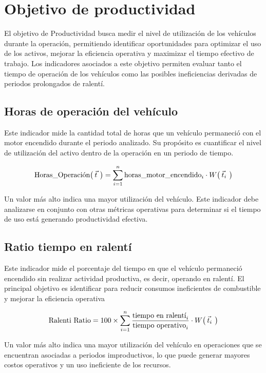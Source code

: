 \section{Objetivo de productividad}
El objetivo de Productividad busca medir el nivel de utilización de los vehículos durante la operación, permitiendo identificar oportunidades para optimizar el uso de los activos, mejorar la eficiencia operativa y maximizar el tiempo efectivo de trabajo. Los indicadores asociados a este objetivo permiten evaluar tanto el tiempo de operación de los vehículos como las posibles ineficiencias derivadas de periodos prolongados de ralentí.


\subsection{Horas de operación del vehículo}
Este indicador mide la cantidad total de horas que un vehículo permaneció con el motor encendido durante el periodo analizado. Su propósito es cuantificar el nivel de utilización del activo dentro de la operación en un periodo de tiempo.

\begin{equation*}
    \text{Horas\_Operación}\big( \hspace{0.07cm} \smash{\vec{t}}\,\vphantom{t} \hspace{0.07cm} \big) = \sum_{i=1}^{n} \text{horas\_motor\_encendido}_i \cdot W\big( \hspace{0.07cm} \smash{\vec{t}_i}\,\vphantom{t_i} \hspace{0.07cm} \big)
\end{equation*}

Un valor más alto indica una mayor utilización del vehículo. Este indicador debe analizarse en conjunto con otras métricas operativas para determinar si el tiempo de uso está generando productividad efectiva.

\subsection{Ratio tiempo en ralentí}
Este indicador mide el porcentaje del tiempo en que el vehículo permaneció encendido sin realizar actividad productiva, es decir, operando en ralentí. El principal objetivo es identificar para reducir consumos ineficientes de combustible y mejorar la eficiencia operativa


\begin{equation*}
    \text{Ralenti Ratio} = 100 \times \sum_{i=1}^{n} \frac{\text{tiempo en ralentí}_i}{\text{tiempo operativo}_i} \cdot W\big( \hspace{0.07cm} \smash{\vec{t}_i}\,\vphantom{t_i} \hspace{0.07cm} \big)
\end{equation*}

Un valor más alto indica una mayor utilización del vehículo en operaciones que se encuentran asociadas a periodos improductivos, lo que puede generar mayores costos operativos y un uso ineficiente de los recursos.